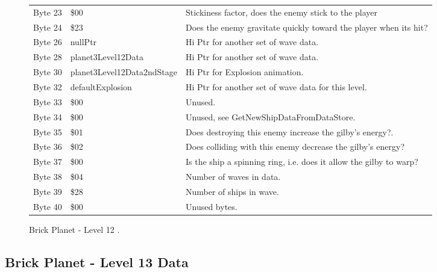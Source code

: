 \begin{figure}[H]
{\begin{adjustbox}{width=12cm}
\begin{tabular}{lll}
 Byte 23 & \$00                        & Stickiness factor, does the enemy stick to the player              \\
 Byte 24 & \$23                        & Does the enemy gravitate quickly toward the player when its hit?   \\
 Byte 26 & nullPtr                    & Hi Ptr for another set of wave data.                               \\
 Byte 28 & planet3Level12Data         & Hi Ptr for another set of wave data.                               \\
 Byte 30 & planet3Level12Data2ndStage & Hi Ptr for Explosion animation.                                    \\
 Byte 32 & defaultExplosion           & Hi Ptr for another set of wave data for this level.                \\
 Byte 33 & \$00                        & Unused.                                                            \\
 Byte 34 & \$00                        & Unused, see GetNewShipDataFromDataStore.                           \\
 Byte 35 & \$01                        & Does destroying this enemy increase the gilby's energy?.           \\
 Byte 36 & \$02                        & Does colliding with this enemy decrease the gilby's energy?        \\
 Byte 37 & \$00                        & Is the ship a spinning ring, i.e. does it allow the gilby to warp? \\
 Byte 38 & \$04                        & Number of waves in data.                                           \\
 Byte 39 & \$28                        & Number of ships in wave.                                           \\
 Byte 40 & \$00                        & Unused bytes.                                                      \\
\bottomrule
\end{tabular}

  \end{adjustbox}

  }\caption*{Brick Planet - Level 12
.}
\end{figure}

\clearpage
\subsection{Brick Planet - Level 13 Data}

